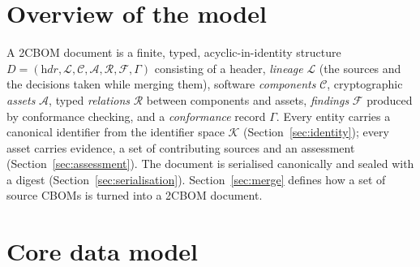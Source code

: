 \documentclass[11pt,a4paper]{article}
\newcommand{\twocbom}{2CBOM}
\newcommand{\Ids}{\mathcal{K}}
\newcommand{\Assets}{\mathcal{A}}
\newcommand{\Comps}{\mathcal{C}}
\newcommand{\Rels}{\mathcal{R}}
\newcommand{\Finds}{\mathcal{F}}
\theoremstyle{definition}
\theoremstyle{plain}
\begin{document}
\section{Overview of the model}
A \twocbom{} document is a finite, typed, acyclic-in-identity structure
$D = (\textit{hdr}, \mathcal{L}, \Comps, \Assets, \Rels, \Finds, \Gamma)$ consisting of a header,
\emph{lineage} $\mathcal{L}$ (the sources and the decisions taken while merging them), software
\emph{components} $\Comps$, cryptographic \emph{assets} $\Assets$, typed \emph{relations} $\Rels$
between components and assets, \emph{findings} $\Finds$ produced by conformance checking, and a
\emph{conformance} record $\Gamma$. Every entity carries a canonical identifier from the
identifier space $\Ids$ (Section~\ref{sec:identity}); every asset carries evidence, a set of
contributing sources and an assessment (Section~\ref{sec:assessment}). The document is
serialised canonically and sealed with a digest (Section~\ref{sec:serialisation}). Section~\ref{sec:merge}
defines how a set of source CBOMs is turned into a \twocbom{} document.

\section{Core data model}
\end{document}
